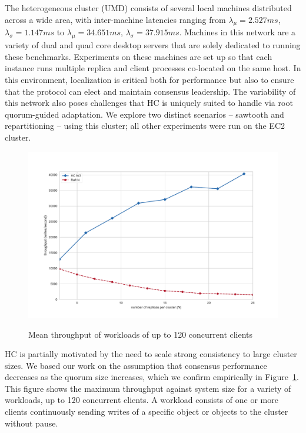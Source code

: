 The heterogeneous cluster (UMD) consists of several local machines distributed across a wide area, with inter-machine latencies ranging from
$\lambda_{\mu}=2.527ms$,
$\lambda_{\sigma}=1.147ms$ to $\lambda_{\mu}=34.651ms$,
$\lambda_{\sigma}=37.915ms$.
Machines in this network are a variety of dual and quad core desktop servers that are solely dedicated to running these benchmarks.
Experiments on these machines are set up so that each instance runs multiple replica and client processes co-located on the same host.
In this environment, localization is critical both for performance but also to ensure that the protocol can elect and maintain consensus leadership.
The variability of this network also poses challenges that HC is uniquely suited to handle via root quorum-guided adaptation.
We explore two distinct scenarios -- sawtooth and repartitioning -- using this cluster; all other experiments were run on the EC2 cluster.

\begin{figure}
    \begin{center}
        \includegraphics[width=5in]{figures/ch03_scaling_consensus.pdf}
    \end{center}
    \renewcommand{\baselinestretch}{1}
    \small\normalsize

    \begin{quote}
        \caption[Scaling Consensus HC vs. Raft]{Mean throughput of workloads of up to 120 concurrent clients}
        \label{fig:ch03_scaling_consensus}
    \end{quote}
\end{figure}
\renewcommand{\baselinestretch}{2}
\small\normalsize

HC is partially motivated by the need to scale strong consistency to large cluster sizes.
We based our work on the assumption that consensus performance decreases as the quorum size increases, which we confirm empirically in Figure~\ref{fig:ch03_scaling_consensus}.
This figure shows the maximum throughput against system size for a variety of workloads, up to 120 concurrent clients.
A workload consists of one or more clients continuously sending writes of a specific object or objects to the cluster without pause.

